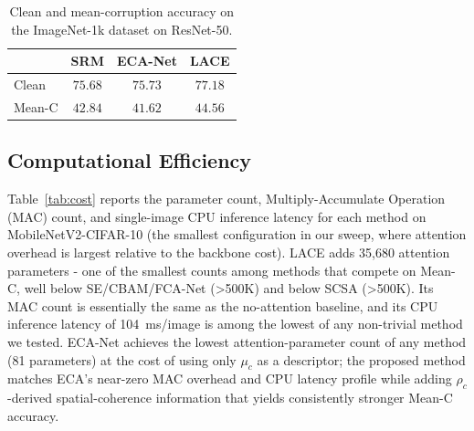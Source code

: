 \documentclass{bmvc2k}
\begin{document}

\begin{table}[t]
\centering
\caption{Clean and mean-corruption accuracy on the ImageNet-1k dataset on ResNet-50.}
\label{tab:performanceimagenet}
\renewcommand{\arraystretch}{0.70}
\small
\begin{tabular}{lccc}
\toprule
 & SRM & ECA-Net & \textbf{LACE} \\
\midrule
Clean  & $75.68$ & $75.73$ & $\mathbf{77.18}$ \\
Mean-C & $42.84$ & $41.62$ & $\mathbf{44.56}$ \\
\bottomrule
\end{tabular}
\end{table}


\subsection{Computational Efficiency}

Table~\ref{tab:cost} reports the parameter count, Multiply-Accumulate Operation (MAC) count, and single-image CPU inference latency for each method on MobileNetV2-CIFAR-10 (the smallest configuration in our sweep, where attention overhead is largest relative to the backbone cost). LACE adds 35,680 attention parameters - one of the smallest counts among methods that compete on Mean-C, well below SE/CBAM/FCA-Net (>500K) and below SCSA (>500K). Its MAC count is essentially the same as the no-attention baseline, and its CPU inference latency of 104~ms/image is among the lowest of any non-trivial method we tested.
ECA-Net achieves the lowest attention-parameter count of any method (81 parameters) at the cost of using only $\mu_c$ as a descriptor; the proposed method matches ECA's near-zero MAC overhead and CPU latency profile while adding $\rho_c$-derived spatial-coherence information that yields consistently stronger Mean-C accuracy.
\end{document}
